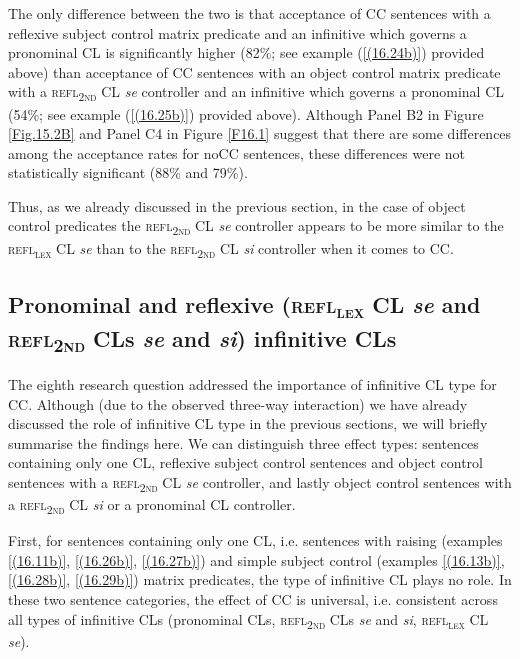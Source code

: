 \noindent The only difference between the two is that acceptance of CC sentences with a reflexive subject control matrix predicate and an infinitive which governs a pronominal CL is significantly higher (82\%; see example (\ref{(16.24b)}) provided above) than acceptance of CC sentences with an object control matrix predicate with a \textsc{refl\textsubscript{2nd}} CL \textit{se} controller and an infinitive which governs a pronominal CL (54\%; see example (\ref{(16.25b)}) provided above). Although Panel B2 in Figure \ref{Fig.15.2B} and Panel C4 in Figure \ref{F16.1} suggest that there are some differences among the acceptance rates for noCC sentences, these differences were not statistically significant (88\% and 79\%). 

Thus, as we already discussed in the previous section, in the case of object control predicates the \textsc{refl\textsubscript{2nd}} CL \textit{se} controller appears to be more similar to the \textsc{refl\textsubscript{\textsc{lex}}} CL \textit{se} than to the \textsc{refl\textsubscript{2nd}} CL \textit{si} controller when it comes to CC. 

\subsection{Pronominal and reflexive (\textsc{refl\textsubscript{\textsc{lex}}} CL \textit{se} and \textsc{refl\textsubscript{2nd}} CLs \textit{se} and \textit{si}) infinitive CLs}
\label{Pronominal and reflexive infinitive CLs}
The eighth research question addressed the importance of infinitive CL type for CC. Although (due to the observed three-way interaction) we have already discussed the role of infinitive CL type in the previous sections, we will briefly summarise the findings here. We can distinguish three effect types: sentences containing only one CL, reflexive subject control sentences and object control sentences with a \textsc{refl\textsubscript{2nd}} CL \textit{se} controller, and lastly object control sentences with a \textsc{refl\textsubscript{2nd}} CL \textit{si} or a pronominal CL controller. 

First, for sentences containing only one CL, i.e. sentences with raising (examples \ref{(16.11b)}, \ref{(16.26b)}, \ref{(16.27b)}) and simple subject control (examples \ref{(16.13b)}, \ref{(16.28b)}, \ref{(16.29b)}) matrix predicates, the type of infinitive CL plays no role. In these two sentence categories, the effect of CC is universal, i.e. consistent across all types of infinitive CLs (pronominal CLs, \textsc{refl\textsubscript{2nd}} CLs \textit{se} and \textit{si}, \textsc{refl\textsubscript{\textsc{lex}}} CL \textit{se}). 

